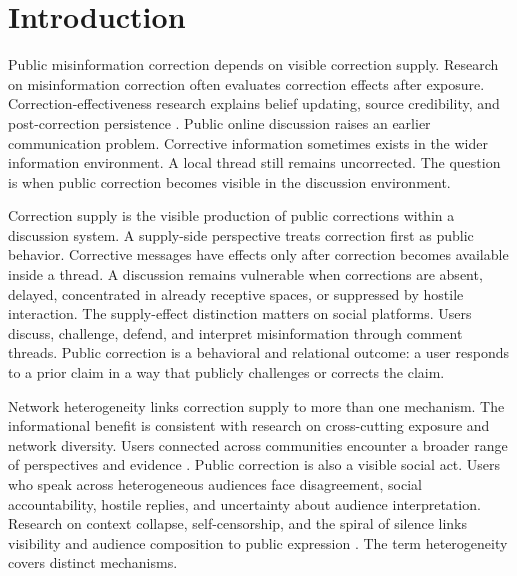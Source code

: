 \documentclass[namedate,unnumsec,webpdf,contemporary,large]{oup-authoring-template}
\begin{document}



\maketitle



\section{Introduction}

Public misinformation correction depends on visible correction supply. Research on misinformation correction often evaluates correction effects after exposure. Correction-effectiveness research explains belief updating, source credibility, and post-correction persistence \citep[e.g.,][]{lewandowsky2012misinformation,chan2017debunking,walter2018unring,ecker2022psychological}. Public online discussion raises an earlier communication problem. Corrective information sometimes exists in the wider information environment. A local thread still remains uncorrected. The question is when public correction becomes visible in the discussion environment.

Correction supply is the visible production of public corrections within a discussion system. A supply-side perspective treats correction first as public behavior. Corrective messages have effects only after correction becomes available inside a thread. A discussion remains vulnerable when corrections are absent, delayed, concentrated in already receptive spaces, or suppressed by hostile interaction. The supply-effect distinction matters on social platforms. Users discuss, challenge, defend, and interpret misinformation through comment threads. Public correction is a behavioral and relational outcome: a user responds to a prior claim in a way that publicly challenges or corrects the claim.

Network heterogeneity links correction supply to more than one mechanism. The informational benefit is consistent with research on cross-cutting exposure and network diversity. Users connected across communities encounter a broader range of perspectives and evidence \citep{mutz2002crosscutting,mutz2006hearing}. Public correction is also a visible social act. Users who speak across heterogeneous audiences face disagreement, social accountability, hostile replies, and uncertainty about audience interpretation. Research on context collapse, self-censorship, and the spiral of silence links visibility and audience composition to public expression \citep{noelleneumann1974spiral,marwick2011tweet,hampton2014spiral}. The term heterogeneity covers distinct mechanisms.
\end{document}
